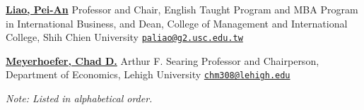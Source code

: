 \documentclass[11pt,letterpaper]{article}
\begin{document}
\begingroup\raggedright{}\href{https://uscetp.usc.edu.tw/var/file/102/1102/img/149873815.pdf}{\textbf{Liao,
Pei-An}} \newline{} Professor and Chair, English Taught Program and MBA
Program in International Business, and Dean, College of Management and
International College, Shih Chien University \newline{}
\href{mailto:paliao@g2.usc.edu.tw}{\nolinkurl{paliao@g2.usc.edu.tw}}\par\nopagebreak\endgroup

\begingroup\raggedright{}\href{https://business.lehigh.edu/directory/chad-d-meyerhoefer}{\textbf{Meyerhoefer,
Chad D.}} \newline{} Arthur F. Searing Professor and Chairperson,
Department of Economics, Lehigh University \newline{}
\href{mailto:chm308@lehigh.edu}{\nolinkurl{chm308@lehigh.edu}}\par\nopagebreak\endgroup

\vspace{2pt}
\noindent\textit{\small Note: Listed in alphabetical order.}
\end{document}
